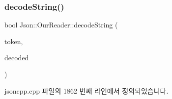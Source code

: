 \subsubsection{\texorpdfstring{decode\+String()}{decodeString()}\hspace{0.1cm}{\footnotesize\ttfamily [2/2]}}
{\footnotesize\ttfamily bool Json\+::\+Our\+Reader\+::decode\+String (\begin{DoxyParamCaption}\item[{\hyperlink{class_json_1_1_our_reader_1_1_token}{Token} \&}]{token,  }\item[{\hyperlink{json_8h_a1e723f95759de062585bc4a8fd3fa4be}{J\+S\+O\+N\+C\+P\+P\+\_\+\+S\+T\+R\+I\+NG} \&}]{decoded }\end{DoxyParamCaption})\hspace{0.3cm}{\ttfamily [private]}}



jsoncpp.\+cpp 파일의 1862 번째 라인에서 정의되었습니다.


